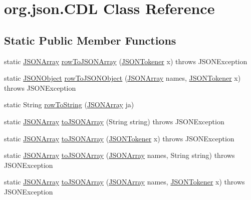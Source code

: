 \hypertarget{classorg_1_1json_1_1CDL}{\section{org.\-json.\-C\-D\-L Class Reference}
\label{classorg_1_1json_1_1CDL}
}
\subsection*{Static Public Member Functions}
\begin{DoxyCompactItemize}
\item 
static \hyperlink{classorg_1_1json_1_1JSONArray}{J\-S\-O\-N\-Array} \hyperlink{classorg_1_1json_1_1CDL_acecd36f26ee8966dea2cd9dcd5683331}{row\-To\-J\-S\-O\-N\-Array} (\hyperlink{classorg_1_1json_1_1JSONTokener}{J\-S\-O\-N\-Tokener} x)  throws J\-S\-O\-N\-Exception 
\item 
static \hyperlink{classorg_1_1json_1_1JSONObject}{J\-S\-O\-N\-Object} \hyperlink{classorg_1_1json_1_1CDL_a1903e6355ac99487c50bac0c70a618ff}{row\-To\-J\-S\-O\-N\-Object} (\hyperlink{classorg_1_1json_1_1JSONArray}{J\-S\-O\-N\-Array} names, \hyperlink{classorg_1_1json_1_1JSONTokener}{J\-S\-O\-N\-Tokener} x)  throws J\-S\-O\-N\-Exception 
\item 
static String \hyperlink{classorg_1_1json_1_1CDL_ad428294b24ca60b441e60fa6b7b168bc}{row\-To\-String} (\hyperlink{classorg_1_1json_1_1JSONArray}{J\-S\-O\-N\-Array} ja)
\item 
static \hyperlink{classorg_1_1json_1_1JSONArray}{J\-S\-O\-N\-Array} \hyperlink{classorg_1_1json_1_1CDL_a0d7e17e87f97c37d9326e3347a8abf2b}{to\-J\-S\-O\-N\-Array} (String string)  throws J\-S\-O\-N\-Exception 
\item 
static \hyperlink{classorg_1_1json_1_1JSONArray}{J\-S\-O\-N\-Array} \hyperlink{classorg_1_1json_1_1CDL_ace400a8f91feb12d6d823757a7641f8b}{to\-J\-S\-O\-N\-Array} (\hyperlink{classorg_1_1json_1_1JSONTokener}{J\-S\-O\-N\-Tokener} x)  throws J\-S\-O\-N\-Exception 
\item 
static \hyperlink{classorg_1_1json_1_1JSONArray}{J\-S\-O\-N\-Array} \hyperlink{classorg_1_1json_1_1CDL_ae2085eaedac675d9fa3e151d5d8de607}{to\-J\-S\-O\-N\-Array} (\hyperlink{classorg_1_1json_1_1JSONArray}{J\-S\-O\-N\-Array} names, String string)  throws J\-S\-O\-N\-Exception 
\item 
static \hyperlink{classorg_1_1json_1_1JSONArray}{J\-S\-O\-N\-Array} \hyperlink{classorg_1_1json_1_1CDL_af55973f9de779acb04e33b0198a5525c}{to\-J\-S\-O\-N\-Array} (\hyperlink{classorg_1_1json_1_1JSONArray}{J\-S\-O\-N\-Array} names, \hyperlink{classorg_1_1json_1_1JSONTokener}{J\-S\-O\-N\-Tokener} x)  throws J\-S\-O\-N\-Exception 

\end{DoxyCompactItemize}
